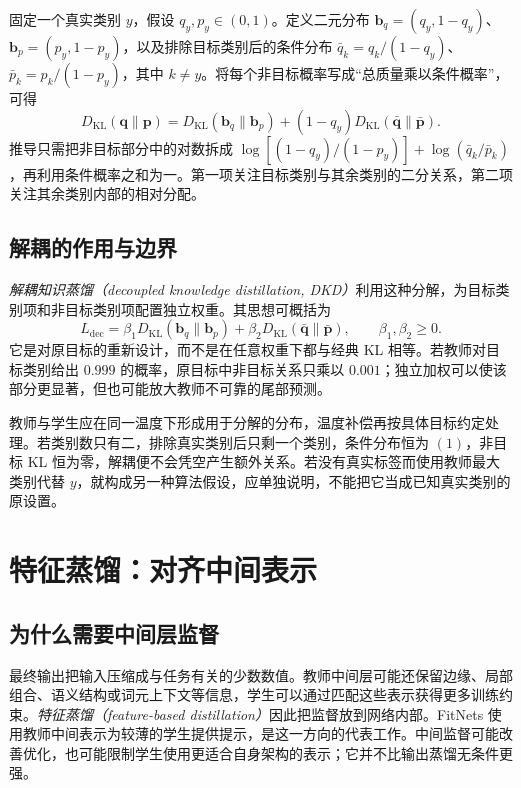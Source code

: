 \documentclass[UTF8,12pt,a4paper,fontset=fandol]{ctexart}
\begin{document}
固定一个真实类别 $y$，假设 $q_y,p_y\in(0,1)$。定义二元分布 $\mathbf b_q=(q_y,1-q_y)$、$\mathbf b_p=(p_y,1-p_y)$，以及排除目标类别后的条件分布 $\bar q_k=q_k/(1-q_y)$、$\bar p_k=p_k/(1-p_y)$，其中 $k\ne y$。将每个非目标概率写成“总质量乘以条件概率”，可得
\begin{equation}
 D_{\mathrm{KL}}(\mathbf q\|\mathbf p)
 =D_{\mathrm{KL}}(\mathbf b_q\|\mathbf b_p)
 +(1-q_y)D_{\mathrm{KL}}(\bar{\mathbf q}\|\bar{\mathbf p}).
 \label{eq:kd-decomposition}
\end{equation}
推导只需把非目标部分中的对数拆成 $\log[(1-q_y)/(1-p_y)]+\log(\bar q_k/\bar p_k)$，再利用条件概率之和为一。第一项关注目标类别与其余类别的二分关系，第二项关注其余类别内部的相对分配。

\subsection{解耦的作用与边界}
\emph{解耦知识蒸馏（decoupled knowledge distillation, DKD）}利用这种分解，为目标类别项和非目标类别项配置独立权重\cite{zhao2022}。其思想可概括为
\[
 L_{\mathrm{dec}}=\beta_1D_{\mathrm{KL}}(\mathbf b_q\|\mathbf b_p)
 +\beta_2D_{\mathrm{KL}}(\bar{\mathbf q}\|\bar{\mathbf p}),\qquad \beta_1,\beta_2\geq0.
\]
它是对原目标的重新设计，而不是在任意权重下都与经典 KL 相等。若教师对目标类别给出 $0.999$ 的概率，原目标中非目标关系只乘以 $0.001$；独立加权可以使该部分更显著，但也可能放大教师不可靠的尾部预测。

教师与学生应在同一温度下形成用于分解的分布，温度补偿再按具体目标约定处理。若类别数只有二，排除真实类别后只剩一个类别，条件分布恒为 $(1)$，非目标 KL 恒为零，解耦便不会凭空产生额外关系。若没有真实标签而使用教师最大类别代替 $y$，就构成另一种算法假设，应单独说明，不能把它当成已知真实类别的原设置。

\section{特征蒸馏：对齐中间表示}
\label{sec:kd-feature}

\subsection{为什么需要中间层监督}
最终输出把输入压缩成与任务有关的少数数值。教师中间层可能还保留边缘、局部组合、语义结构或词元上下文等信息，学生可以通过匹配这些表示获得更多训练约束。\emph{特征蒸馏（feature-based distillation）}因此把监督放到网络内部。FitNets 使用教师中间表示为较薄的学生提供提示，是这一方向的代表工作\cite{romero2015}。中间监督可能改善优化，也可能限制学生使用更适合自身架构的表示；它并不比输出蒸馏无条件更强。
\end{document}
